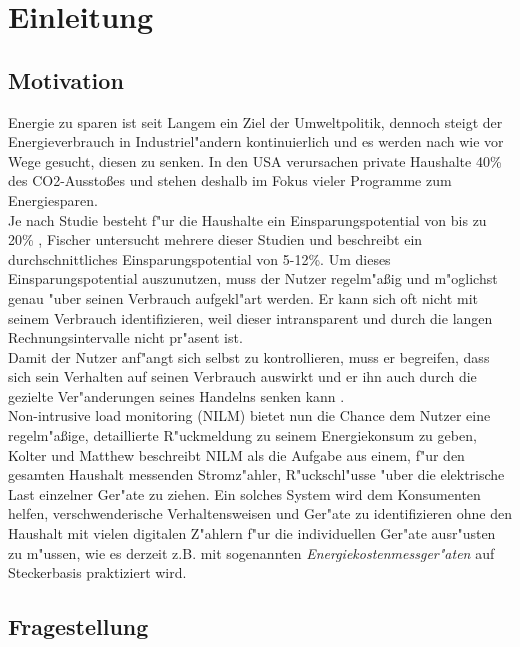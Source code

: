 \section{Einleitung}
\label{Einleitung}

\subsection{Motivation}
\label{Motivation}
	Energie zu sparen ist seit Langem ein Ziel der Umweltpolitik, dennoch steigt der Energieverbrauch in Industriel"andern kontinuierlich und es werden nach wie vor Wege gesucht, diesen zu senken. 
	In den USA verursachen private Haushalte 40\% des CO2-Aussto{\ss}es \cite{vandenbergh2008individual} und stehen deshalb im Fokus vieler Programme zum Energiesparen. \\
	Je nach Studie besteht f"ur die Haushalte ein Einsparungspotential von bis zu 20\% \cite{armel2013disaggregation}, Fischer \cite{fischer2008feedback} untersucht mehrere dieser Studien und beschreibt ein durchschnittliches Einsparungspotential von 5-12\%. 
	Um dieses Einsparungspotential auszunutzen, muss der Nutzer regelm"a{\ss}ig und m"oglichst genau "uber seinen Verbrauch aufgekl"art werden. 	%
	Er kann sich oft nicht mit seinem Verbrauch identifizieren, weil dieser intransparent und durch die langen Rechnungsintervalle nicht pr"asent ist. \\
	Damit der Nutzer anf"angt sich selbst zu kontrollieren, muss er begreifen, dass sich sein Verhalten auf seinen Verbrauch auswirkt und er ihn auch durch die gezielte Ver"anderungen seines Handelns senken kann \cite{fischer2008feedback}.\\
	Non-intrusive load monitoring (NILM) bietet nun die Chance dem Nutzer eine regelm"a{\ss}ige, detaillierte R"uckmeldung zu seinem Energiekonsum zu geben, Kolter und Matthew \cite{kolter2011redd} beschreibt NILM als die Aufgabe aus einem, f"ur den gesamten Haushalt messenden Stromz"ahler, R"uckschl"usse "uber die elektrische Last einzelner Ger"ate zu ziehen.
	Ein solches System wird dem Konsumenten helfen, verschwenderische Verhaltensweisen und Ger"ate zu identifizieren ohne den Haushalt mit vielen digitalen Z"ahlern f"ur die individuellen Ger"ate ausr"usten zu m"ussen, wie es derzeit z.B. mit sogenannten \textit{Energiekostenmessger"aten} auf Steckerbasis praktiziert wird.

\subsection{Fragestellung}
\label{Fragestellung}


